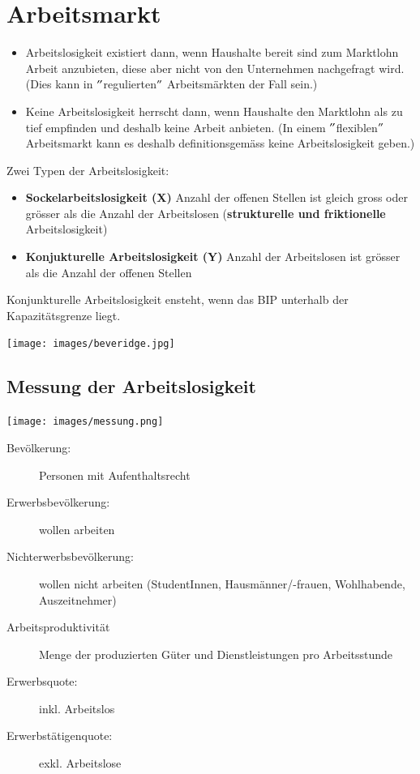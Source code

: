 \section{Arbeitsmarkt}
\begin{itemize}
	\item Arbeitslosigkeit existiert dann, wenn Haushalte bereit sind zum Marktlohn Arbeit anzubieten, diese aber nicht von den Unternehmen nachgefragt wird. (Dies kann in $"$regulierten$"$ Arbeitsmärkten der Fall sein.)
	\item Keine Arbeitslosigkeit herrscht dann, wenn Haushalte den Marktlohn als zu tief empfinden und deshalb keine Arbeit anbieten. (In einem $"$flexiblen$"$ Arbeitsmarkt kann es deshalb definitionsgemäss keine Arbeitslosigkeit geben.)
\end{itemize}

\begin{minipage}{12cm}
    Zwei Typen der Arbeitslosigkeit:
	\begin{itemize}
		\item \textbf{Sockelarbeitslosigkeit (X)}\newline
		 Anzahl der offenen Stellen ist gleich gross oder grösser als die Anzahl der Arbeitslosen (\textbf{strukturelle und friktionelle} Arbeitslosigkeit)
		\item \textbf{Konjukturelle Arbeitslosigkeit (Y)}\newline
		Anzahl der Arbeitslosen ist grösser als  die Anzahl der offenen Stellen
	\end{itemize}
\vspace{0.5cm}
Konjunkturelle Arbeitslosigkeit ensteht, wenn das BIP unterhalb der Kapazitätsgrenze liegt.
\end{minipage}
\begin{minipage}{5cm}
	\centering
	\texttt{[image: images/beveridge.jpg]}
\end{minipage}
\flushleft

\subsection{Messung der Arbeitslosigkeit}
\begin{multicols}{2}
\texttt{[image: images/messung.png]}
\columnbreak
\begin{description}
	\item[Bevölkerung:] Personen mit Aufenthaltsrecht
	\item[Erwerbsbevölkerung:] wollen arbeiten
	\item[Nichterwerbsbevölkerung:] wollen nicht arbeiten (StudentInnen, Hausmänner/-frauen, Wohlhabende, Auszeitnehmer)
	\item[Arbeitsproduktivität] Menge der produzierten Güter und Dienstleistungen pro Arbeitsstunde
	\item[Erwerbsquote:] inkl. Arbeitslos
	\item[Erwerbstätigenquote:] exkl. Arbeitslose
\end{description}
\end{multicols}

